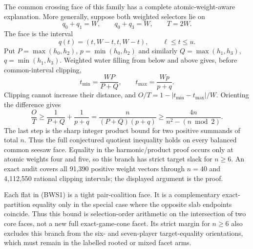 \documentclass[11pt]{article}
\begin{document}
The common crossing face of this family has a complete atomic-weight-aware
explanation.  More generally, suppose both weighted selectors lie on
\[
 q_0+q_1=W,\qquad q_0+q_3=W,\qquad T=2W.                       \tag{BWS1}
\]
The face is the interval
\[
 q(t)=(t,W-t,t,W-t),\qquad \ell\le t\le u.                    \tag{BWS2}
\]
Put $P=\max(h_0,h_2)$, $p=\min(h_0,h_2)$ and similarly
$Q=\max(h_1,h_3)$, $q=\min(h_1,h_3)$.  Weighted water filling from below
and above gives, before common-interval clipping,
\[
 t_{\min}=\frac{WP}{P+Q},\qquad t_{\max}=\frac{Wp}{p+q}.       \tag{BWS3}
\]
Clipping cannot increase their distance, and
$O/T=1-|t_{\min}-t_{\max}|/W$.  Orienting the difference gives
\[
 \frac OT\ge\frac1{P+Q}+\frac1{p+q}
 =\frac{n}{(P+Q)(p+q)}
 \ge\frac{4n}{n^2-(n\bmod2)}.                                 \tag{BWS4}
\]
The last step is the sharp integer product bound for two positive summands
of total $n$.  Thus the full conjectured quotient inequality holds on every
balanced common seesaw face.  Equality in the harmonic/product proof occurs
only at atomic weights four and five, so this branch has strict target slack
for $n\ge6$.  An exact audit covers all 91,390 positive weight vectors through
$n=40$ and 4,112,550 rational clipping intervals; the displayed argument is
the proof.

Each flat in (BWS1) is a tight pair-coalition face.  It is a complementary
exact-partition equality only in the special case where the opposite slab
endpoints coincide.  Thus this bound is selection-order arithmetic on the
intersection of two core faces, not a new full exact-game-cone facet.  Its
strict margin for $n\ge6$ also excludes this branch from the six- and
seven-player target-equality orientations, which must remain in the labelled
rooted or mixed facet arms.
\end{document}
